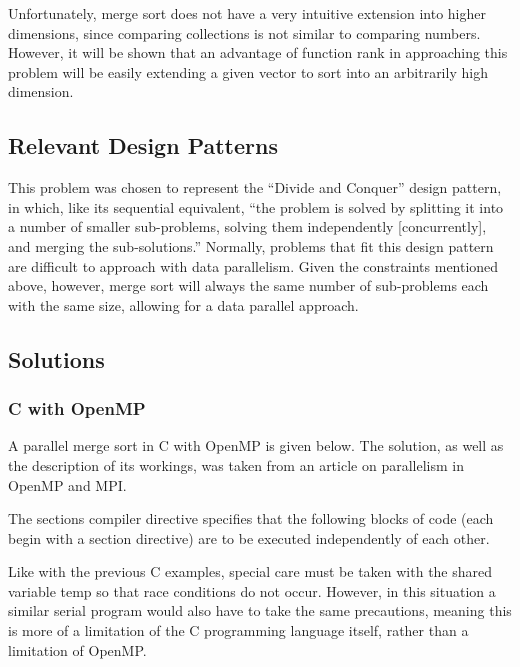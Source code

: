 Unfortunately, merge sort does not have a very intuitive extension into higher dimensions, 
since comparing collections is not similar to comparing numbers.
However, it will be shown that an advantage of function rank in approaching this problem
will be easily extending a given vector to sort into an arbitrarily high dimension.

\subsection{Relevant Design Patterns}
This problem was chosen to represent the ``Divide and Conquer'' design pattern, \cite{mass}
in which, like its sequential equivalent,
``the problem is solved by splitting it into a number of smaller sub-problems, 
solving them independently [concurrently], and merging the sub-solutions.''
Normally, problems that fit this design pattern are difficult to approach with data parallelism.
Given the constraints mentioned above, however,
merge sort will always the same number of sub-problems each with the same size, 
allowing for a data parallel approach.

\subsection{Solutions}
\subsubsection{C with OpenMP}
A parallel merge sort in C with OpenMP is given below.
The solution, as well as the description of its workings, 
was taken from an article on parallelism in OpenMP and MPI\cite{mergeomp}.

\begin{singlespacing}
\begin{small}

\end{small}
\end{singlespacing}

The \ttfamily sections \normalfont compiler directive %
specifies that the following blocks of code (each begin with a \ttfamily section \normalfont directive) 
are to be executed independently of each other.

Like with the previous C examples, special care must be taken with the shared variable \ttfamily temp \normalfont 
so that race conditions do not occur.
However, in this situation a similar serial program would also have to take the same precautions, 
meaning this is more of a limitation of the C programming language itself, rather than a limitation of OpenMP.

